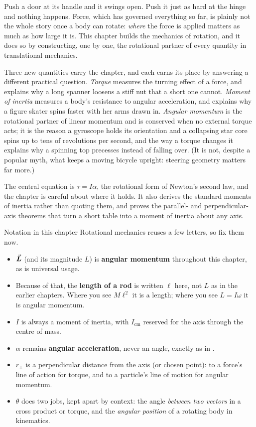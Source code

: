
Push a door at its handle and it swings open. Push it just as hard at the hinge and nothing happens. Force,
which has governed everything so far, is plainly not the whole story once a body can rotate: \emph{where} the
force is applied matters as much as how large it is. This chapter builds the mechanics of rotation, and it does
so by constructing, one by one, the rotational partner of every quantity in translational mechanics.

Three new quantities carry the chapter, and each earns its place by answering a different practical question.
\emph{Torque} measures the turning effect of a force, and explains why a long spanner loosens a stiff nut that
a short one cannot. \emph{Moment of inertia} measures a body's resistance to angular acceleration, and explains
why a figure skater spins faster with her arms drawn in. \emph{Angular momentum} is the rotational partner of
linear momentum and is conserved when no external torque acts; it is the reason a gyroscope holds its orientation and a collapsing
star core spins up to tens of revolutions per second, and the way a torque changes it explains why a spinning top precesses instead of falling over. (It is not,
despite a popular myth, what keeps a moving bicycle upright: steering geometry matters far more.)

The central equation is $\tau=I\alpha$, the rotational form of Newton's second law, and the chapter is careful
about where it holds. It also derives the standard moments of inertia rather than quoting them, and proves
the parallel- and perpendicular-axis theorems that turn a short table into a moment of inertia about any axis.

\begin{remarkbox}{Notation in this chapter}
Rotational mechanics reuses a few letters, so fix them now.
\begin{itemize}
\item $\vec{\bm{L}}$ (and its magnitude $L$) is \textbf{angular momentum} throughout this chapter, as is
      universal usage.
\item Because of that, the \textbf{length of a rod} is written $\ell$ here, not $L$ as in the earlier
      chapters. Where you see $M\ell^{2}$ it is a length; where you see $L=I\omega$ it is angular
      momentum.
\item $I$ is always a moment of inertia, with $I_{\text{cm}}$ reserved for the axis through the centre
      of mass.
\item $\alpha$ remains \textbf{angular acceleration}, never an angle, exactly as in .
\item $r_\perp$ is a perpendicular distance from the axis (or chosen point): to a force's line of action
      for torque, and to a particle's line of motion for angular momentum.
\item $\theta$ does two jobs, kept apart by context: the angle \emph{between two vectors} in a cross
      product or torque, and the \emph{angular position} of a rotating body in kinematics.
\end{itemize}
\end{remarkbox}


